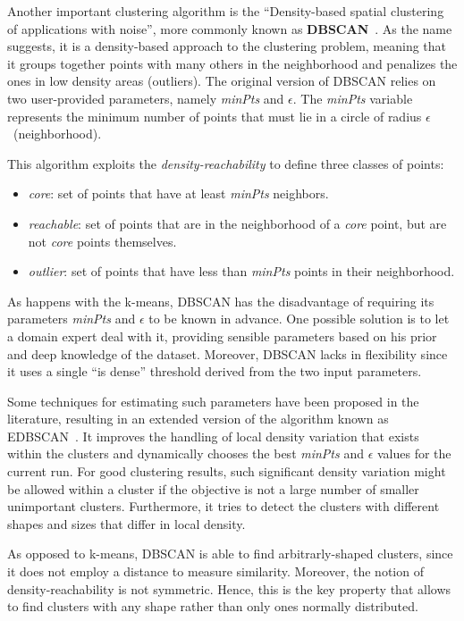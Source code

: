Another important clustering algorithm is the ``Density-based spatial clustering of applications with noise'', more commonly known as \textbf{DBSCAN}~\cite{ester1996density}.
As the name suggests, it is a density-based approach to the clustering problem,
meaning that it groups together points with many others in the neighborhood
and penalizes the ones in low density areas (outliers).
The original version of DBSCAN relies on two user-provided parameters, namely \emph{minPts} and $\epsilon$.
The \emph{minPts} variable represents the minimum number of points that must lie in a circle of radius $\epsilon$~(neighborhood).

This algorithm exploits the \emph{density-reachability} to define three classes of points:
\begin{itemize}
    \item \emph{core}: set of points that have at least \emph{minPts} neighbors.
    \item \emph{reachable}:
        set of points that are in the neighborhood of a \emph{core} point,
        but are not \emph{core} points themselves.
    \item \emph{outlier}:
        set of points that have less than \emph{minPts} points in their neighborhood.
\end{itemize}

As happens with the k-means, DBSCAN has the disadvantage of requiring its parameters \emph{minPts} and $\epsilon$ to be known in advance.
One possible solution is to let a domain expert deal with it, providing sensible parameters based on his prior and deep knowledge of the dataset.
Moreover, DBSCAN lacks in flexibility since it uses a single ``is dense'' threshold derived from the two input parameters.

Some techniques for estimating such parameters have been proposed in the literature, resulting in an extended version of the algorithm known as EDBSCAN~\cite{elbatta2013dynamic, ram2009enhanced}.
It improves the handling of local density variation that exists within the clusters and dynamically chooses the best \emph{minPts} and $\epsilon$ values for the current run.
For good clustering results, such significant density variation might be allowed within a cluster if the objective is not a large number of smaller unimportant clusters.
Furthermore, it tries to detect the clusters with different shapes and sizes that differ in local density.

As opposed to k-means, DBSCAN is able to find arbitrarly-shaped clusters, since it does not employ a distance to measure similarity.
Moreover, the notion of density-reachability is not symmetric.
Hence, this is the key property that allows to find clusters with any shape rather than only ones normally distributed.\\


